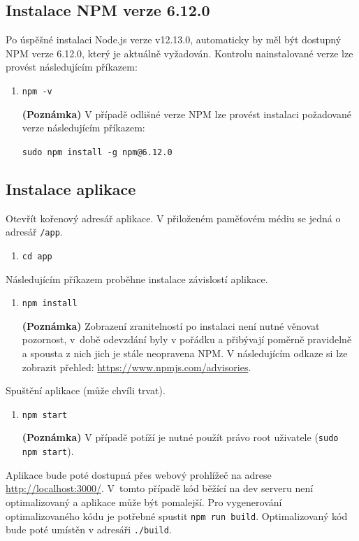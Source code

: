 \subsection*{Instalace NPM verze 6.12.0}
Po úspěšné instalaci Node.js verze v12.13.0, automaticky by měl být dostupný NPM verze 6.12.0, který je aktuálně vyžadován. Kontrolu nainstalované verze lze provést následujícím příkazem:
\begin{enumerate}
    \item \texttt{npm -v}
 
    \textbf{(Poznámka)} V případě odlišné verze NPM lze provést instalaci požadované verze následujícím příkazem:
		
	\texttt{sudo npm install -g npm@6.12.0}
\end{enumerate}

\subsection*{Instalace aplikace}
Otevřít kořenový adresář aplikace. V přiloženém paměťovém médiu se jedná o adresář \texttt{/app}.
\begin{enumerate}
    \item \texttt{cd app}
\end{enumerate}
Následujícím příkazem proběhne instalace závislostí aplikace.
\begin{enumerate}[resume]
    \item \texttt{npm install}
    
    \textbf{(Poznámka)} Zobrazení zranitelností po instalaci není nutné věnovat pozornost, v~době odevzdání byly v pořádku a přibývají poměrně pravidelně a spousta z nich jich je stále neopravena NPM. V následujícím odkaze si lze zobrazit přehled: \url{https://www.npmjs.com/advisories}.
\end{enumerate}
Spuštění aplikace (může chvíli trvat).
\begin{enumerate}[resume]
    \item \texttt{npm start}
    
    \textbf{(Poznámka)} V případě potíží je nutné použít právo root uživatele (\texttt{sudo npm start}).
\end{enumerate}
Aplikace bude poté dostupná přes webový prohlížeč na adrese \url{http://localhost:3000/}. V~tomto případě kód běžící na dev serveru není optimalizovaný a aplikace může být pomalejší. Pro vygenerování optimalizovaného kódu je potřebné spustit \texttt{npm run build}. Optimalizovaný kód bude poté umístěn v adresáři \texttt{./build}.

